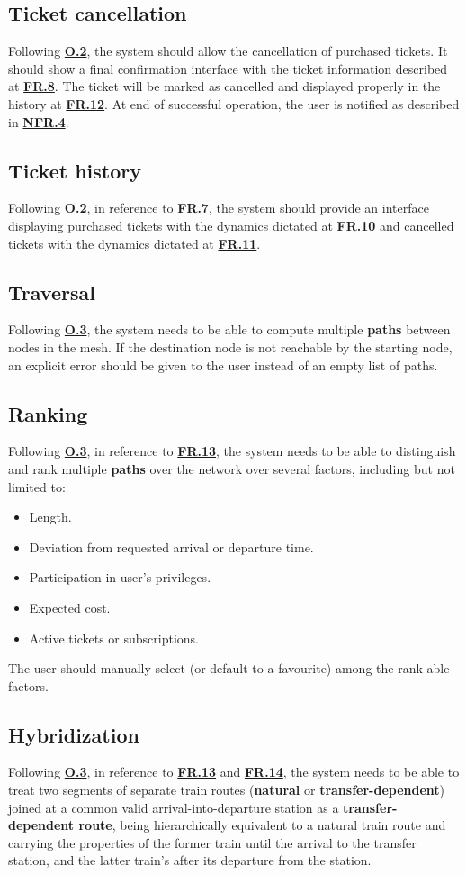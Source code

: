 \documentclass[12pt]{article}
\renewcommand\bf[1]{\textbf{#1}}
\newcommand\hyl[1]{\hyperref[#1]{\bf{#1}}}
\begin{document}
\subsection{Ticket cancellation} \label{FR.11}
Following \hyl{O.2}, the system should allow the cancellation of purchased tickets. It should show a final confirmation interface with the ticket information described at \hyl{FR.8}. The ticket will be marked as cancelled and displayed properly in the history at \hyl{FR.12}.
At end of successful operation, the user is notified as described in \hyl{NFR.4}.

\subsection{Ticket history} \label{FR.12}
Following \hyl{O.2}, in reference to \hyl{FR.7}, the system should provide an interface displaying purchased tickets with the dynamics dictated at \hyl{FR.10} and cancelled tickets with the dynamics dictated at \hyl{FR.11}.

\subsection{Traversal} \label{FR.13}
Following \hyl{O.3}, the system needs to be able to compute multiple \bf{paths} between nodes in the mesh.
If the destination node is not reachable by the starting node, an explicit error should be given to the user instead of an empty list of paths.

\subsection{Ranking} \label{FR.14}
Following \hyl{O.3}, in reference to \hyl{FR.13}, the system needs to be able to distinguish and rank multiple \bf{paths} over the network over several factors, including but not limited to:
\begin{itemize}
	\item Length.
	\item Deviation from requested arrival or departure time.
	\item Participation in user's privileges.
	\item Expected cost.
	\item Active tickets or subscriptions.
\end{itemize}
The user should manually select (or default to a favourite) among the rank-able factors.

\subsection{Hybridization} \label{FR.15}
Following \hyl{O.3}, in reference to \hyl{FR.13} and \hyl{FR.14}, the system needs to be able to treat two segments of separate train routes (\bf{natural} or \bf{transfer-dependent}) joined at a common valid arrival-into-departure station as a \bf{transfer-dependent route}, being hierarchically equivalent to a natural train route and carrying 
the properties of the former train until the arrival to the transfer station, and the latter train's after its departure from the station.
\end{document}
